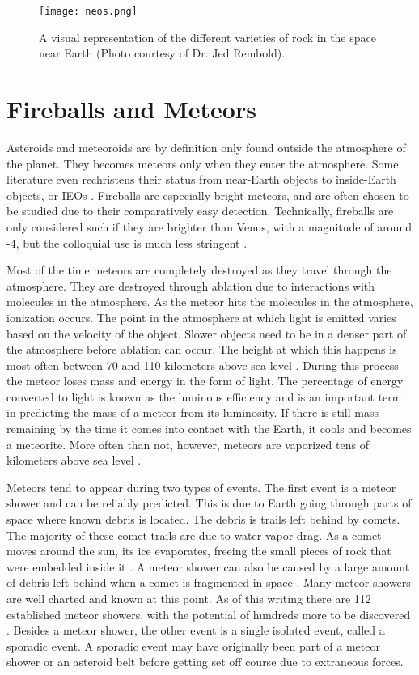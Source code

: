 \begin{figure}[ht!]
  \centering
  \texttt{[image: neos.png]}
  \caption{A visual representation of the different varieties of rock in the space near Earth (Photo courtesy of Dr. Jed Rembold).}
  \label{fig:neos}
\end{figure}


\section{Fireballs and Meteors}

Asteroids and meteoroids are by definition only found outside the atmosphere of the planet. They becomes meteors only when they enter the atmosphere. Some literature even rechristens their status from near-Earth objects to inside-Earth objects, or IEOs \cite{Bottke2007}. Fireballs are especially bright meteors, and are often chosen to be studied due to their comparatively easy detection. Technically, fireballs are only considered such if they are brighter than Venus, with a magnitude of around -4, but the colloquial use is much less stringent \cite{Harbaugh2008}. 

Most of the time meteors are completely destroyed as they travel through the atmosphere. They are destroyed through ablation due to interactions with molecules in the atmosphere. As the meteor hits the molecules in the atmosphere, ionization occurs. The point in the atmosphere at which light is emitted varies based on the velocity of the object. Slower objects need to be in a denser part of the atmosphere before ablation can occur. The height at which this happens is most often between 70 and 110 kilometers above sea level \cite{Halliday1996}. During this process the meteor loses mass and energy in the form of light. The percentage of energy converted to light is known as the luminous efficiency and is an important term in predicting the mass of a meteor from its luminosity. If there is still mass remaining by the time it comes into contact with the Earth, it cools and becomes a meteorite. More often than not, however, meteors are vaporized tens of kilometers above sea level \cite{Halliday1996}.

Meteors tend to appear during two types of events. The first event is a meteor shower and can be reliably predicted. This is due to Earth going through parts of space where known debris is located. The debris is trails left behind by comets. The majority of these comet trails are due to water vapor drag. As a comet moves around the sun, its ice evaporates, freeing the small pieces of rock that were embedded inside it \cite{Whipple1951}. A meteor shower can also be caused by a large amount of debris left behind when a comet is fragmented in space \cite{Jenniskens2006}. Many meteor showers are well charted and known at this point. As of this writing there are 112 established meteor showers, with the potential of hundreds more to be discovered \cite{RRudawskaZKanuchova2017}. Besides a meteor shower, the other event is a single isolated event, called a sporadic event. A sporadic event may have originally been part of a meteor shower or an asteroid belt before getting set off course due to extraneous forces.

